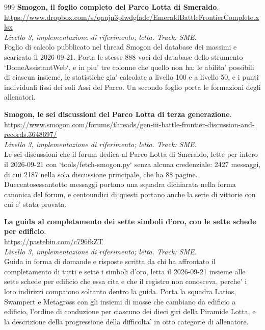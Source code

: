 \begin{thebibliography}{999}
  \textbf{Smogon, il foglio completo del Parco Lotta di Smeraldo}.
  \\ \url{https://www.dropbox.com/s/qaujn3plwdgfadc/EmeraldBattleFrontierComplete.xlsx}
  \\ \emph{Livello 3, implementazione di riferimento; letta. Track: SME.}
  \\ Foglio di calcolo pubblicato nel thread Smogon del database dei massimi e scaricato il 2026-09-21. Porta le stesse 888 voci del database dello strumento `DomeAssistantWeb`, e in piu' tre colonne che quello non ha: le abilita' possibili di ciascun insieme, le statistiche gia' calcolate a livello 100 e a livello 50, e i punti individuali fissi dei soli Assi del Parco. Un secondo foglio porta le formazioni degli allenatori.

  \textbf{Smogon, le sei discussioni del Parco Lotta di terza generazione}.
  \\ \url{https://www.smogon.com/forums/threads/gen-iii-battle-frontier-discussion-and-records.3648697/}
  \\ \emph{Livello 3, implementazione di riferimento; letta. Track: SME.}
  \\ Le sei discussioni che il forum dedica al Parco Lotta di Smeraldo, lette per intero il 2026-09-21 con `tools/fetch-smogon.py` senza alcuna credenziale: 2427 messaggi, di cui 2187 nella sola discussione principale, che ha 88 pagine. Duecentosessantotto messaggi portano una squadra dichiarata nella forma canonica del forum, e centoundici di questi portano anche la serie di vittorie con cui e' stata provata.

  \textbf{La guida al completamento dei sette simboli d'oro, con le sette schede per edificio}.
  \\ \url{https://pastebin.com/c796fkZT}
  \\ \emph{Livello 3, implementazione di riferimento; letta. Track: SME.}
  \\ Guida in forma di domande e risposte scritta da chi ha affrontato il completamento di tutti e sette i simboli d'oro, letta il 2026-09-21 insieme alle sette schede per edificio che essa cita e che il registro non conosceva, perche' i loro indirizzi compaiono soltanto dentro la guida. Porta la squadra Latios, Swampert e Metagross con gli insiemi di mosse che cambiano da edificio a edificio, l'ordine di conduzione per ciascuno dei dieci giri della Piramide Lotta, e la descrizione della progressione della difficolta' in otto categorie di allenatore.


\end{thebibliography}
